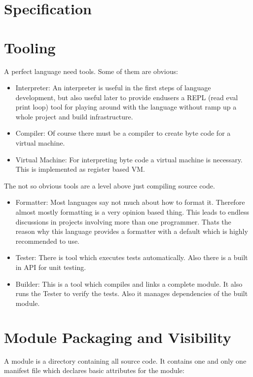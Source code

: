 \documentclass[a4paper,12pt]{report}
\begin{document}
\section{Specification}

\section{Tooling}

A perfect language need tools. Some of them are obvious:

\begin{itemize}
    \item Interpreter: An interpreter is useful in the first steps of language development, but also useful later to provide endusers a REPL (read eval print loop) tool for playing around with the language without ramp up a whole project and build infrastructure.
    \item Compiler: Of course there must be a compiler to create byte code for a virtual machine.
    \item Virtual Machine: For interpreting byte code a virtual machine is necessary. This is implemented as register based VM.
\end{itemize}

The not so obvious tools are a level above just compiling source code.

\begin{itemize}
    \item Formatter: Most languages say not much about how to format it. Therefore almost mostly formatting is a very opinion based thing. This leads to endless discussions in projects involving more than one programmer. Thats the reason why this language provides a formatter with a default which is highly recommended to use.
    \item Tester: There is tool which executes tests automatically. Also there is a built in API for unit testing.
    \item Builder: This is a tool which compiles and links a complete module. It also runs the Tester to verify the tests. Also it manages dependencies of the built module.
\end{itemize}

\section{Module Packaging and Visibility}

A module is a directory containing all source code. It contains one and only one manifest file which declares basic attributes for the module:
\end{document}
